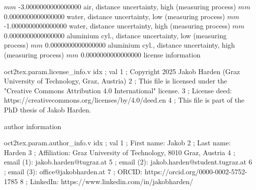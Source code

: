\expandafter\def\csname oct2tex.param.distairuc1.u\endcsname{\ensuremath{mm}}
\expandafter\def\csname oct2tex.param.distairuc1.v\endcsname{-3.0000000000000000}
\expandafter\def\csname oct2tex.param.distairuc2.d\endcsname{air, distance uncertainty, high (measuring process)}
\expandafter\def\csname oct2tex.param.distairuc2.u\endcsname{\ensuremath{mm}}
\expandafter\def\csname oct2tex.param.distairuc2.v\endcsname{0.0000000000000000}
\expandafter\def\csname oct2tex.param.distwatuc1.d\endcsname{water, distance uncertainty, low (measuring process)}
\expandafter\def\csname oct2tex.param.distwatuc1.u\endcsname{\ensuremath{mm}}
\expandafter\def\csname oct2tex.param.distwatuc1.v\endcsname{-1.0000000000000000}
\expandafter\def\csname oct2tex.param.distwatuc2.d\endcsname{water, distance uncertainty, high (measuring process)}
\expandafter\def\csname oct2tex.param.distwatuc2.u\endcsname{\ensuremath{mm}}
\expandafter\def\csname oct2tex.param.distwatuc2.v\endcsname{0.0000000000000000}
\expandafter\def\csname oct2tex.param.distaluuc1.d\endcsname{aluminium cyl., distance uncertainty, low (measuring process)}
\expandafter\def\csname oct2tex.param.distaluuc1.u\endcsname{\ensuremath{mm}}
\expandafter\def\csname oct2tex.param.distaluuc1.v\endcsname{0.0000000000000000}
\expandafter\def\csname oct2tex.param.distaluuc2.d\endcsname{aluminium cyl., distance uncertainty, high (measuring process)}
\expandafter\def\csname oct2tex.param.distaluuc2.u\endcsname{\ensuremath{mm}}
\expandafter\def\csname oct2tex.param.distaluuc2.v\endcsname{0.0000000000000000}
\expandafter\def\csname oct2tex.param.license_info.d\endcsname{license information}
\begin{filecontents}[overwrite]{oct2tex.param.license_info.v}
idx ; val
1 ; Copyright 2025 Jakob Harden (Graz University of Technology, Graz, Austria)
2 ; This file is licensed under the "Creative Commons Attribution 4.0 International" license.
3 ; License deed: https://creativecommons.org/licenses/by/4.0/deed.en
4 ; This file is part of the PhD thesis of Jakob Harden.
\end{filecontents}
\expandafter\def\csname oct2tex.param.author_info.d\endcsname{author information}
\begin{filecontents}[overwrite]{oct2tex.param.author_info.v}
idx ; val
1 ; First name: Jakob
2 ; Last name: Harden
3 ; Affiliation: Graz University of Technology, 8010 Graz, Austria
4 ; email (1): jakob.harden@tugraz.at
5 ; email (2): jakob.harden@student.tugraz.at
6 ; email (3): office@jakobharden.at
7 ; ORCID: https://orcid.org/0000-0002-5752-1785
8 ; LinkedIn: https://www.linkedin.com/in/jakobharden/
\end{filecontents}
